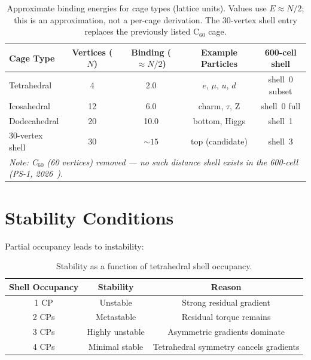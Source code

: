 \documentclass[11pt]{article}
\begin{document}
\begin{table}[h]
\centering
\begin{tabular}{lcccc}
\toprule
Cage Type & Vertices ($N$) & Binding ($\approx N/2$) & Example Particles
  & 600-cell shell \\
\midrule
Tetrahedral & 4 & 2.0 & $e$, $\mu$, $u$, $d$ & shell~0 subset \\
Icosahedral & 12 & 6.0 & charm, $\tau$, Z & shell~0 full \\
Dodecahedral & 20 & 10.0 & bottom, Higgs & shell~1 \\
30-vertex shell & 30 & ${\sim}15$ & top (candidate) & shell~3 \\
\midrule
\multicolumn{5}{l}{\small\textit{Note: C$_{60}$ (60 vertices) removed ---
  no such distance shell exists in the 600-cell (PS-1, 2026~\cite{ps1}).}} \\
\bottomrule
\end{tabular}
\caption{Approximate binding energies for cage types (lattice units).
  Values use $E \approx N/2$; this is an approximation, not a per-cage
  derivation.  The 30-vertex shell entry replaces the previously listed
  C$_{60}$ cage.}
\label{tab:cage_binding}
\end{table}

\section{Stability Conditions}

Partial occupancy leads to instability:

\begin{table}[h]
\centering
\begin{tabular}{ccc}
\toprule
Shell Occupancy & Stability & Reason \\
\midrule
1 CP & Unstable & Strong residual gradient \\
2 CPs & Metastable & Residual torque remains \\
3 CPs & Highly unstable & Asymmetric gradients dominate \\
4 CPs & Minimal stable & Tetrahedral symmetry cancels gradients \\
\bottomrule
\end{tabular}
\caption{Stability as a function of tetrahedral shell occupancy.}
\label{tab:stability}
\end{table}
\end{document}
